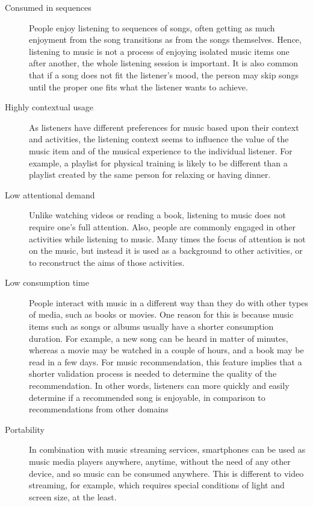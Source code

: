 \begin{description}
	\item [Consumed in sequences] People enjoy listening to sequences of songs, often getting as much enjoyment from the song transitions as from the songs themselves. Hence, listening to music is not a process of enjoying isolated music items one after another, the whole listening session is important. 
	It is also common that if a song does not fit the listener's mood, the person may skip songs until the proper one fits what the listener wants to achieve.

	\item [Highly contextual usage] As listeners have different  preferences for music based upon their context and activities, the listening context seems to influence the value of the music item and of the musical experience to the individual listener. For example, a playlist for physical training is likely to be different than a playlist created by the same person for relaxing or having dinner.

	\item [Low attentional demand] Unlike watching videos or reading a book, listening to music does not require one's full attention. Also, people are commonly engaged in other activities while listening to music. Many times the focus of attention is not on the music, but instead it is used as a background to other activities, or to reconstruct the aims of those activities. 


	\item [Low consumption time] People interact with music in a different way than they do with other types of media, such as books or movies. One reason for this is because music items such as songs or albums usually have a shorter consumption duration. For example, a new song can be heard in matter of minutes, whereas a movie may be watched in a couple of hours, and a book may be read in a few days. 
	For music recommendation, this feature implies that a shorter validation process is needed to determine the quality of the recommendation. In other words, listeners can more quickly and easily determine if a recommended song is enjoyable, in comparison to recommendations from other domains

	\item [Portability] In combination with music streaming services, smartphones can be used as music media players anywhere, anytime, without the need of any other device, and so music can be consumed anywhere. This is different to video streaming, for example, which requires special conditions of light and screen size, at the least.

\end{description}

